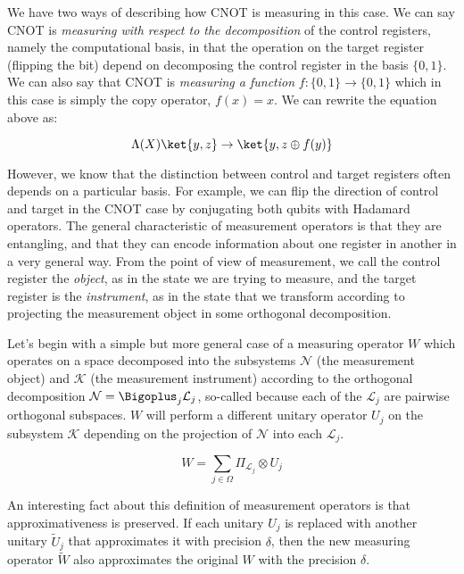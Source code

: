\documentclass{article}
\begin{document}
We have two ways of describing how CNOT is measuring in this case.
We can say CNOT is \emph{measuring with respect to the decomposition} of
the control registers, namely the computational basis, in that the
operation on the target register (flipping the bit) depend on decomposing the
control register in the basis $\{0,1\}$. We can also say that CNOT is
\emph{measuring a function} $f:\{0,1\} \rightarrow \{0,1\}$ which in this
case is simply the copy operator, $f(x) = x$. We can rewrite the equation
above as:

\begin{equation}
\Lambda(X)\ket{y,z} \rightarrow \ket{y, z \oplus f(y)}
\end{equation}

However, we know that the distinction between control and target registers
often depends on a particular basis. For example, we can flip the direction
of control and target in the CNOT case by conjugating both qubits with
Hadamard operators. The general characteristic of measurement operators
is that they are entangling, and that they can encode information about
one register in another in a very general way.
From the point of view of measurement, we call the control register the
\emph{object}, as in the state we are trying to measure, and the target register
is the \emph{instrument}, as in the state that we transform according to
projecting the measurement object in some orthogonal decomposition.

Let's begin with a simple but more general case of a measuring operator
$W$ which operates on a space decomposed into the subsystems $\mathcal{N}$
(the measurement object) and $\mathcal{K}$ (the measurement instrument)
according to the orthogonal decomposition
$\mathcal{N} = \Bigoplus_j \mathcal{L}_j$, so-called because
each of the $\mathcal{L}_j$ are pairwise orthogonal subspaces.
$W$ will perform a different unitary
operator $U_j$ on the subsystem $\mathcal{K}$
depending on the projection of $\mathcal{N}$ into each $\mathcal{L}_j$.

\begin{equation}
W = \sum_{j \in \Omega} \Pi_{\mathcal{L}_j} \otimes U_j
\end{equation}

An interesting fact about this definition of measurement operators is
that approximativeness is preserved. If each unitary $U_j$ is replaced with
another unitary $\tilde{U}_j$ that approximates it with precision $\delta$,
then the new measuring operator $\tilde{W}$ also approximates the original
$W$ with the precision $\delta$.
\end{document}
